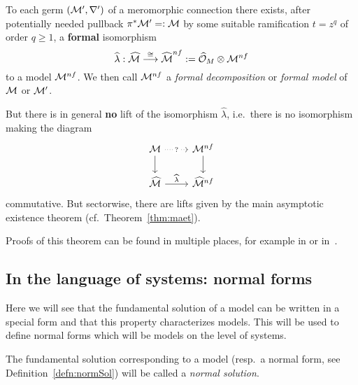 \begin{thm}\label{thm:leveltTurittin}
  To each germ $(\mathcal{M}',\nabla')$ of a meromorphic connection there exists, after
  potentially needed pullback $\pi^{*}\textcolor{black}{\mathcal{M}'}=:\mathcal{M}$ by some
  suitable ramification $t=z^q$ of order $q\geq1$, a \textbf{formal} isomorphism
  \[
    \widehat{\lambda}:\widehat{\mathcal{M}}\overset{\cong}\longrightarrow
    \widehat{\textcolor{black}{\mathcal{M}}}^{nf}:=\widehat{\mathcal{O}}_M\otimes\mathcal{M}^{nf}
  \]
  to a model $\mathcal{M}^{nf}$.
  We then call $\mathcal{M}^{nf}$ a \emph{formal decomposition} or \emph{formal model}
  of $\mathcal{M}$ or $\mathcal{M}'$.
  \begin{s-rem}\label{rem:leveltTurittin}
    But there is in general \textbf{no} lift of the isomorphism $\hat\lambda$,
    i.e.\ there is no isomorphism making the diagram
    \[ \begin{tikzcd}
        \cM \dar \arrow[dotted]{r}[description]{?} & \cM^{nf} \dar
        \\\hat\cM \rar{\hat\lambda} & \hat\cM^{nf}
    \end{tikzcd} \]
    commutative.
    But sectorwise, there are lifts given by the main asymptotic existence
    theorem (cf.\ Theorem~\ref{thm:maet}).
  \end{s-rem}
\end{thm}
Proofs of this theorem can be found in multiple places, for example in
\cite[Thm.5.4.7]{sabbah_cimpa90} or in~\cite{myBa}.

\subsection{In the language of systems: normal forms}\label{sec:normalForms}
Here we will see that the fundamental solution of a model can be written in a
special form and that this property characterizes models. This will be used to
define normal forms which will be models on the level of systems.
\begin{defn}
  The fundamental solution corresponding to a model (resp.\ a normal form, see
  Definition~\ref{defn:normSol}) will be called a
  \emph{normal solution}.
\end{defn}


